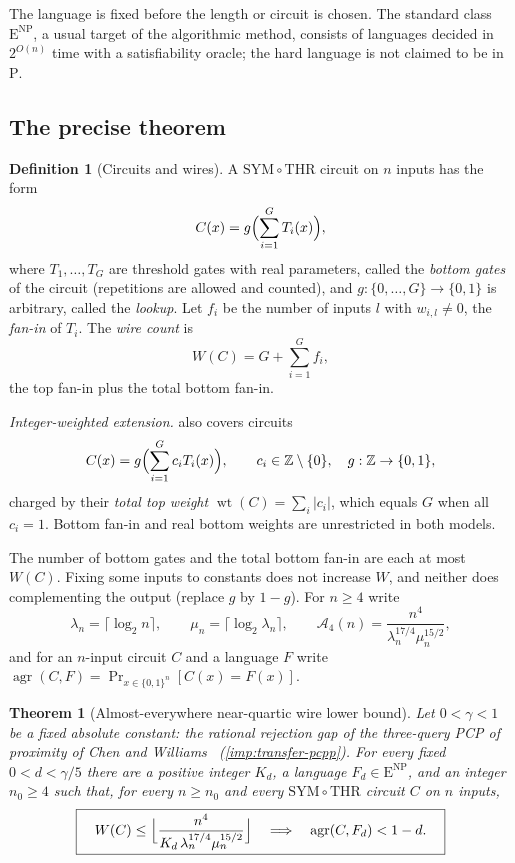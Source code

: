 \documentclass[11pt,letterpaper]{article}
\newtheorem{theorem}{Theorem}[section]
\theoremstyle{definition}
\newtheorem{definition}{Definition}[section]
\theoremstyle{remark}
\newcommand{\Z}{\mathbb Z}
\newcommand{\THR}{\mathrm{THR}}
\newcommand{\SYM}{\mathrm{SYM}}
\newcommand{\ENP}{\mathrm{E}^{\mathrm{NP}}}
\newcommand{\agr}{\operatorname{agr}}
\newcommand{\topwt}{\operatorname{wt}}
\newcommand{\lgx}{\log_2}
\begin{document}
The language is fixed before the length or circuit is chosen.
The standard class \(\ENP\), a usual target of the algorithmic
method, consists of languages decided in \(2^{O(n)}\) time with a
satisfiability oracle; the hard language is not claimed to be in \(\mathrm P\).

\subsection{The precise theorem}\label{sec:main}

\begin{definition}[Circuits and wires]\label{def:class}
A \(\SYM\circ\THR\) circuit on \(n\) inputs has the form
\[
 C(x)=g\Bigl(\sum_{i=1}^{G}T_i(x)\Bigr),
\]
where \(T_1,\dots,T_G\) are threshold gates with real parameters,
called the \emph{bottom gates} of the circuit (repetitions are allowed
and counted), and \(g:\{0,\dots,G\}\to\{0,1\}\) is arbitrary, called
the \emph{lookup}. Let \(f_i\) be the number of inputs \(l\) with
\(w_{i,l}\ne0\), the \emph{fan-in} of \(T_i\). The \emph{wire count}
is
\[
 W(C)=G+\sum_{i=1}^Gf_i,
\]
the top fan-in plus the total bottom fan-in.

\emph{Integer-weighted extension.}  also covers circuits
\[
 C(x)=g\Bigl(\sum_{i=1}^{G}c_iT_i(x)\Bigr),\qquad
 c_i\in\Z\setminus\{0\},\quad g:\Z\to\{0,1\},
\]
charged by their \emph{total top weight} \(\topwt(C)=\sum_i|c_i|\),
which equals \(G\) when all \(c_i=1\). Bottom fan-in and real bottom
weights are unrestricted in both models.
\end{definition}

The number of bottom gates and the total bottom fan-in are each at most
\(W(C)\). Fixing some inputs to constants does not increase \(W\),
and neither does complementing the output (replace \(g\) by \(1-g\)).
For \(n\ge4\) write
\[
 \lambda_n=\lceil\lgx n\rceil,\qquad
 \mu_n=\lceil\lgx\lambda_n\rceil,\qquad
 \mathcal A_4(n)=\frac{n^4}{\lambda_n^{17/4}\mu_n^{15/2}},
\]
and for an \(n\)-input circuit \(C\) and a language \(F\) write
\(\agr(C,F)=\Pr_{x\in\{0,1\}^n}[C(x)=F(x)]\).

\begin{theorem}[Almost-everywhere near-quartic wire lower bound]
\label{thm:main}
Let \(0<\gamma<1\) be a fixed absolute constant: the rational rejection gap of the three-query PCP of proximity of Chen and Williams~\cite[Lemma~24]{CW19} (\cref{imp:transfer-pcpp}). For every fixed \(0<d<\gamma/5\) there are
a positive integer \(K_d\), a language \(F_d\in\ENP\), and an
integer \(n_0\ge4\) such that, for every \(n\ge n_0\) and every
\(\SYM\circ\THR\) circuit \(C\) on \(n\) inputs,
\[
 \boxed{\quad
 W(C)\le\Bigl\lfloor\frac{n^4}{K_d\,\lambda_n^{17/4}\mu_n^{15/2}}\Bigr\rfloor
 \quad\Longrightarrow\quad \agr(C,F_d)<1-d .\quad}
\]
\end{theorem}
\end{document}
